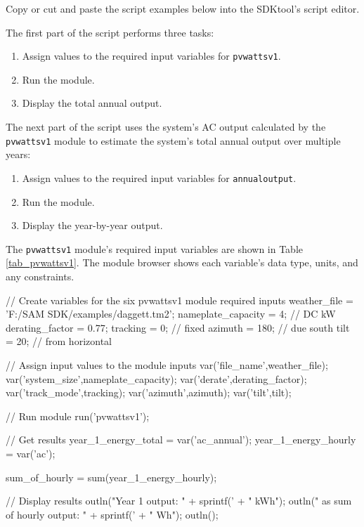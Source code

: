 \documentclass{scrartcl} %
\newcommand{\+}{\discretionary{\mbox{\scriptsize$\hookleftarrow$}}{}{}}
\begin{document}
Copy or cut and paste the script examples below into the SDKtool's script editor.

The first part of the script performs three tasks:

\begin{enumerate}
\item Assign values to the required input variables for \texttt{pvwattsv1}.
\item Run the module.
\item Display the total annual output.
\end{enumerate}

The next part of the script uses the system's AC output calculated by the \texttt{pvwattsv1} module to estimate the system's total annual output over multiple years:

\begin{enumerate}
\item Assign values to the required input variables for \texttt{annualoutput}.
\item Run the module.
\item Display the year-by-year output.
\end{enumerate}

The \texttt{pvwattsv1} module's required input variables are shown in Table \ref{tab_pvwattsv1}. The module browser shows each variable's data type, units, and any constraints.

\begin{verbatimtab}

// Create variables for the six pvwattsv1 module required inputs
weather_file = 'F:/SAM SDK/examples/daggett.tm2';
nameplate_capacity = 4; // DC kW
derating_factor = 0.77;
tracking = 0; // fixed
azimuth = 180; // due south
tilt = 20; // from horizontal

// Assign input values to the module inputs
var('file_name',weather_file);
var('system_size',nameplate_capacity);
var('derate',derating_factor);
var('track_mode',tracking);
var('azimuth',azimuth);
var('tilt',tilt);

// Run module
run('pvwattsv1');

// Get results
year_1_energy_total = var('ac_annual');
year_1_energy_hourly = var('ac');

sum_of_hourly = sum(year_1_energy_hourly);

// Display results
outln("Year 1 output: " + sprintf('%
                                  + " kWh");
outln("  as sum of hourly output: " + sprintf('%
                                              + " Wh");
outln();

\end{verbatimtab}
\end{document}

